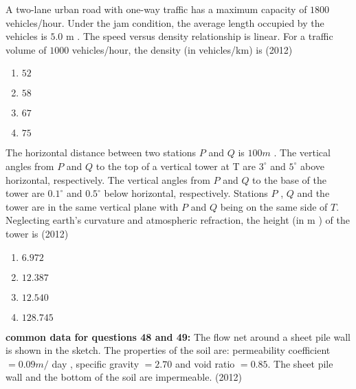 	\item A two-lane urban road with one-way traffic has a maximum capacity of $1800$ vehicles/hour. Under the jam condition, the average length occupied by the vehicles is $5.0$ m . The speed versus density relationship is linear. For a traffic volume of $1000$ vehicles/hour, the density (in vehicles/km) is
	\hfill{(2012)}
		\begin{enumerate}
		       \item $52$
		       \item $58$
		       \item $67$
		       \item $75$
        	\end{enumerate}	
	\item The horizontal distance between two stations $P$ and $Q$ is $100 m$ . The vertical angles from $P$ and $Q$ to the top of a vertical tower at T are $3^{\circ}$ and $5^{\circ}$ above horizontal, respectively. The vertical angles from $P$ and $Q$ to the base of the tower are $0.1^{\circ}$ and $0.5^{\circ}$ below horizontal, respectively. Stations $P$ , $Q$ and the tower are in the same vertical plane with $P$ and $Q$ being on the same side of $T$. Neglecting earth's curvature and atmospheric refraction, the height (in m ) of the tower is
	\hfill{(2012)}
		\begin{enumerate}
			\item $6.972$
            \item $12.387$
            \item $12.540$
            \item $128.745$
        	\end{enumerate}	
    \textbf{common data for questions 48 and 49:}
    The flow net around a sheet pile wall is shown in the sketch. The properties of the soil are: permeability coefficient $=0.09 m /$ day , specific gravity $=2.70$ and void ratio $=0.85$. The sheet pile wall and the bottom of the soil are impermeable.
    \hfill{(2012)}

    

